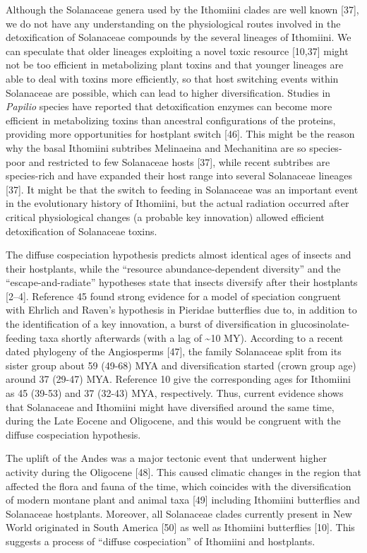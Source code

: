 \documentclass[]{article}
\begin{document}
Although the Solanaceae genera used by the Ithomiini clades are well
known {[}37{]}, we do not have any understanding on the physiological
routes involved in the detoxification of Solanaceae compounds by the
several lineages of Ithomiini. We can speculate that older lineages
exploiting a novel toxic resource {[}10,37{]} might not be too efficient
in metabolizing plant toxins and that younger lineages are able to deal
with toxins more efficiently, so that host switching events within
Solanaceae are possible, which can lead to higher diversification.
Studies in \emph{Papilio} species have reported that detoxification
enzymes can become more efficient in metabolizing toxins than ancestral
configurations of the proteins, providing more opportunities for
hostplant switch {[}46{]}. This might be the reason why the basal
Ithomiini subtribes Melinaeina and Mechanitina are so species-poor and
restricted to few Solanaceae hosts {[}37{]}, while recent subtribes are
species-rich and have expanded their host range into several Solanaceae
lineages {[}37{]}. It might be that the switch to feeding in Solanaceae
was an important event in the evolutionary history of Ithomiini, but the
actual radiation occurred after critical physiological changes (a
probable key innovation) allowed efficient detoxification of Solanaceae
toxins.

The diffuse cospeciation hypothesis predicts almost identical ages of
insects and their hostplants, while the ``resource abundance-dependent
diversity'' and the ``escape-and-radiate'' hypotheses state that insects
diversify after their hostplants {[}2--4{]}. Reference 45 found strong
evidence for a model of speciation congruent with Ehrlich and Raven's
hypothesis in Pieridae butterflies due to, in addition to the
identification of a key innovation, a burst of diversification in
glucosinolate-feeding taxa shortly afterwards (with a lag of
\textasciitilde{}10 MY). According to a recent dated phylogeny of the
Angiosperms {[}47{]}, the family Solanaceae split from its sister group
about 59 (49-68) MYA and diversification started (crown group age)
around 37 (29-47) MYA. Reference 10 give the corresponding ages for
Ithomiini as 45 (39-53) and 37 (32-43) MYA, respectively. Thus, current
evidence shows that Solanaceae and Ithomiini might have diversified
around the same time, during the Late Eocene and Oligocene, and this
would be congruent with the diffuse cospeciation hypothesis.

The uplift of the Andes was a major tectonic event that underwent higher
activity during the Oligocene {[}48{]}. This caused climatic changes in
the region that affected the flora and fauna of the time, which
coincides with the diversification of modern montane plant and animal
taxa {[}49{]} including Ithomiini butterflies and Solanaceae hostplants.
Moreover, all Solanaceae clades currently present in New World
originated in South America {[}50{]} as well as Ithomiini butterflies
{[}10{]}. This suggests a process of ``diffuse cospeciation'' of
Ithomiini and hostplants.
\end{document}
